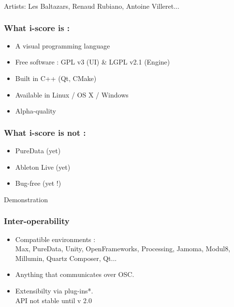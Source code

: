 \documentclass{beamer}
\begin{document}
\begin{frame}
    {\large Artists: Les Baltazars, Renaud Rubiano, Antoine Villeret...}
    
\end{frame}

    \begin{frame}
        \frametitle{What i-score is : }
        \Large
        \begin{itemize}        
        \item A visual programming language       
        \item Free software : GPL v3 (UI) \& LGPL v2.1 (Engine)
        \item Built in C++ (Qt, CMake)        
        \item Available in Linux / OS X / Windows        
        \item Alpha-quality 
        \end{itemize}
    \end{frame}
    \begin{frame}
        \frametitle{What i-score is not : }
        \Large
        \begin{itemize} 
            \item PureData (yet)
            \item Ableton Live (yet)       
            \item Bug-free (yet !)
        \end{itemize}
    \end{frame}
    
    \begin{frame}
    	\centering \Huge Demonstration
    \end{frame}
    
    \begin{frame}
        \frametitle{Inter-operability}
        \Large
        \begin{itemize}
        	\item Compatible environments :\\
	        	 Max, PureData, Unity, OpenFrameworks, Processing, Jamoma, Modul8, Millumin, Quartz Composer, Qt... 
	        \item Anything that communicates over OSC.
	        \item Extensibilty via plug-ins*. \\ {\small *API not stable until v 2.0}
        \end{itemize}
        
    \end{frame}
    
\end{document}
